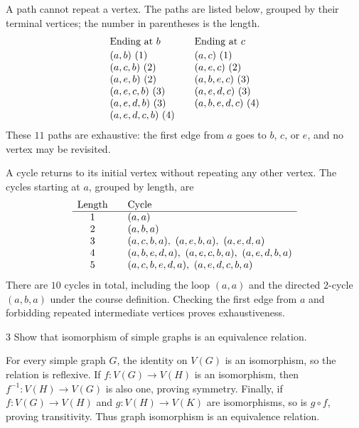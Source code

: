 \documentclass[11pt,oneside]{article}
\begin{document}
\begin{solution}
\begin{problemsubparts}
\item A path cannot repeat a vertex. The paths are listed below, grouped
by their terminal vertices; the number in parentheses is the length.
\[
\begin{array}{l@{\qquad}l}
\text{Ending at }b & \text{Ending at }c \\[2pt]
(a,b)\ (1) &(a,c)\ (1)\\
(a,c,b)\ (2) &(a,e,c)\ (2)\\
(a,e,b)\ (2) &(a,b,e,c)\ (3)\\
(a,e,c,b)\ (3) &(a,e,d,c)\ (3)\\
(a,e,d,b)\ (3) &(a,b,e,d,c)\ (4)\\
(a,e,d,c,b)\ (4) &
\end{array}
\]
These $11$ paths are exhaustive: the first edge from $a$ goes to $b$,
$c$, or $e$, and no vertex may be revisited.

\item A cycle returns to its initial vertex without repeating any other vertex.
The cycles starting at $a$, grouped by length, are
\[
\begin{array}{c@{\qquad}l}
\text{Length}&\text{Cycle}\\ \hline
1&(a,a)\\
2&(a,b,a)\\
3&(a,c,b,a),\ (a,e,b,a),\ (a,e,d,a)\\
4&(a,b,e,d,a),\ (a,e,c,b,a),\ (a,e,d,b,a)\\
5&(a,c,b,e,d,a),\ (a,e,d,c,b,a)
\end{array}
\]
There are $10$ cycles in total, including the loop $(a,a)$ and the directed
$2$-cycle $(a,b,a)$ under the course definition. Checking the first edge
from $a$ and forbidding repeated intermediate vertices proves exhaustiveness.
\end{problemsubparts}
\end{solution}

\begin{problem}{3}
Show that isomorphism of simple graphs is an equivalence relation.
\end{problem}
\begin{solution}
For every simple graph $G$, the identity on $V(G)$ is an isomorphism,
so the relation is reflexive. If $f\colon V(G)\to V(H)$ is an isomorphism,
then $f^{-1}\colon V(H)\to V(G)$ is also one, proving symmetry. Finally,
if $f\colon V(G)\to V(H)$ and $g\colon V(H)\to V(K)$ are isomorphisms,
so is $g\circ f$, proving transitivity. Thus graph isomorphism is an
equivalence relation.
\end{solution}
\end{document}
